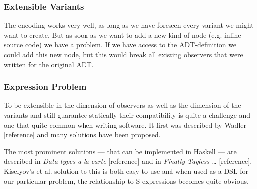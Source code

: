 \documentclass[11pt]{article}
\begin{document}
\subsubsection{Extensible Variants}
\label{sec:orgd934cec}

The encoding works very well, as long as we have foreseen every variant we might
want to create. But as soon as we want to add a new kind of node (e.g. inline
source code) we have a problem. If we have access to the ADT-definition we
could add this new node, but this would break all existing observers that were
written for the original ADT.

\subsubsection{Expression Problem}
\label{sec:org474dc3c}

To be extensible in the dimension of observers as well as the dimension of the
variants and still guarantee statically their compatibility is quite a
challenge and one that quite common when writing software. It first was
described by Wadler [reference] and many solutions have been proposed.

The most prominent solutions — that can be implemented in Haskell — are
described in \emph{Data-types a la carte} [reference] and in \emph{Finally Tagless …}
[reference]. Kiselyov’s et al. solution to this is both easy to use and when
used as a DSL for our particular problem, the relationship to S-expressions
becomes quite obvious.
\end{document}
